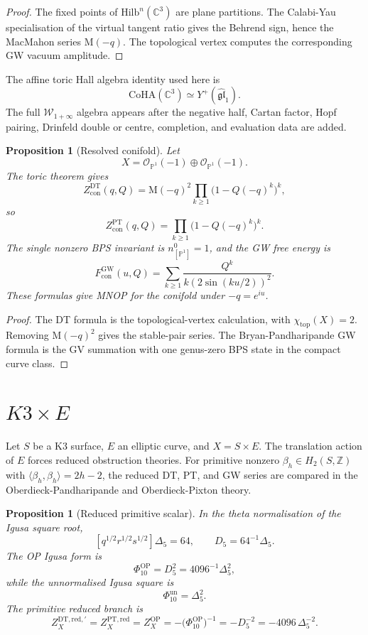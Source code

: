 \documentclass[11pt]{article}
\newtheorem{proposition}[theorem]{Proposition}
\theoremstyle{definition}
\providecommand{\C}{\mathbb{C}}
\providecommand{\Z}{\mathbb{Z}}
\providecommand{\cO}{\mathcal{O}}
\providecommand{\Hilb}{\mathrm{Hilb}}
\providecommand{\CoHA}{\mathrm{CoHA}}
\providecommand{\DT}{\mathrm{DT}}
\providecommand{\GW}{\mathrm{GW}}
\providecommand{\PT}{\mathrm{PT}}
\providecommand{\MM}{\mathrm{M}}
\providecommand{\red}{\mathrm{red}}
\providecommand{\topc}{\mathrm{top}}
\providecommand{\DeltaFive}{\Delta_5}
\providecommand{\PhiTen}{\Phi_{10}}
\providecommand{\Dfive}{D_5}
\providecommand{\Wilpha}{\mathcal{W}_{1+\infty}}
\begin{document}
\begin{proof}
The fixed points of \(\Hilb^n(\C^3)\) are plane partitions.  The
Calabi-Yau specialisation of the virtual tangent ratio gives the Behrend
sign, hence the MacMahon series \(\MM(-q)\).  The topological vertex
computes the corresponding GW vacuum amplitude.
\end{proof}

The affine toric Hall algebra identity used here is
\[
  \CoHA(\C^3)\simeq Y^+(\widehat{\mathfrak{gl}}_1).
\]
The full \(\Wilpha\) algebra appears after the negative half, Cartan
factor, Hopf pairing, Drinfeld double or centre, completion, and
evaluation data are added.

\begin{proposition}[Resolved conifold]
\label{prop:conifold}
Let
\[
  X=\cO_{\mathbb P^1}(-1)\oplus\cO_{\mathbb P^1}(-1).
\]
The toric theorem gives
\[
  Z_{\mathrm{con}}^{\DT}(q,Q)
  =
  \MM(-q)^2
  \prod_{k\ge1}\bigl(1-Q(-q)^k\bigr)^k,
\]
so
\[
  Z_{\mathrm{con}}^{\PT}(q,Q)
  =
  \prod_{k\ge1}\bigl(1-Q(-q)^k\bigr)^k.
\]
The single nonzero BPS invariant is \(n^0_{[\mathbb P^1]}=1\), and the
GW free energy is
\[
  F_{\mathrm{con}}^{\GW}(u,Q)
  =
  \sum_{k\ge1}
  \frac{Q^k}{k(2\sin(ku/2))^2}.
\]
These formulas give MNOP for the conifold under \(-q=e^{iu}\).
\end{proposition}

\begin{proof}
The DT formula is the topological-vertex calculation, with
\(\chi_{\topc}(X)=2\).  Removing \(\MM(-q)^2\) gives the stable-pair
series.  The Bryan-Pandharipande GW formula is the GV summation with
one genus-zero BPS state in the compact curve class.
\end{proof}

\section{\texorpdfstring{\(K3\times E\)}{K3 x E}}

Let \(S\) be a K3 surface, \(E\) an elliptic curve, and \(X=S\times E\).
The translation action of \(E\) forces reduced obstruction theories.
For primitive nonzero \(\beta_h\in H_2(S,\Z)\) with
\(\langle\beta_h,\beta_h\rangle=2h-2\), the reduced DT, PT, and GW
series are compared in the Oberdieck-Pandharipande and
Oberdieck-Pixton theory.

\begin{proposition}[Reduced primitive scalar]
\label{prop:k3e-op-scalar}
In the theta normalisation of the Igusa square root,
\[
  [q^{1/2}r^{1/2}s^{1/2}]\DeltaFive=64,
  \qquad
  \Dfive=64^{-1}\DeltaFive.
\]
The OP Igusa form is
\[
  \PhiTen^{\mathrm{OP}}
  =
  \Dfive^2
  =
  4096^{-1}\DeltaFive^2,
\]
while the unnormalised Igusa square is
\[
  \PhiTen^{\mathrm{un}}=\DeltaFive^2.
\]
The primitive reduced branch is
\[
  Z_X^{\DT,\red,\prime}
  =
  Z_X^{\PT,\red}
  =
  Z_X^{\mathrm{OP}}
  =
  -\bigl(\PhiTen^{\mathrm{OP}}\bigr)^{-1}
  =
  -\Dfive^{-2}
  =
  -4096\,\DeltaFive^{-2}.
\]
\end{proposition}
\end{document}
